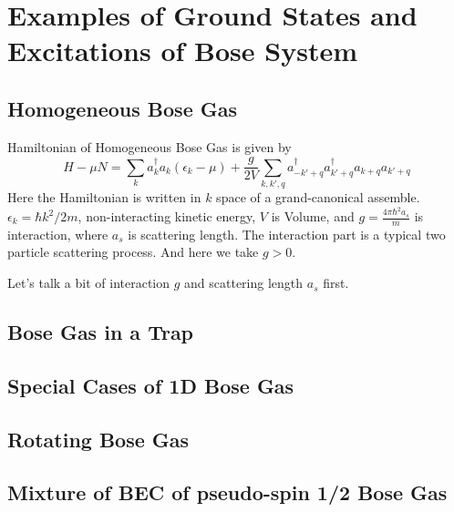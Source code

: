 

\chapter{Examples of Ground States and Excitations of Bose System }
\section{Homogeneous Bose Gas}
Hamiltonian of Homogeneous Bose Gas is given by
\begin{equation}
H-\mu N = \sum_k a_k^\dag a_k (\epsilon_k -\mu) +\frac{g}{2V} \sum_{k,k',q} a_{-k'+q}^\dag a_{k'+q}^\dag a_{k+q}a_{k'+q}
\end{equation}
Here the Hamiltonian is written in $k$ space of a grand-canonical assemble. $\epsilon_k = \hbar k^2/2m$, non-interacting kinetic energy, $V$ is Volume, and $g=\frac{4\pi\hbar^2 a_s}{m}$ is interaction, where $a_s$ is scattering length. The interaction part is a typical two particle scattering process. And here we take $g > 0$.

Let's talk a bit of interaction $g$ and scattering length $a_s$ first.


{\color{red}{(0120 16:00)}}

\section{Bose Gas in a Trap}
\section{Special Cases of 1D Bose Gas}
\section{Rotating Bose Gas}
\section{Mixture of BEC of pseudo-spin 1/2 Bose Gas}
